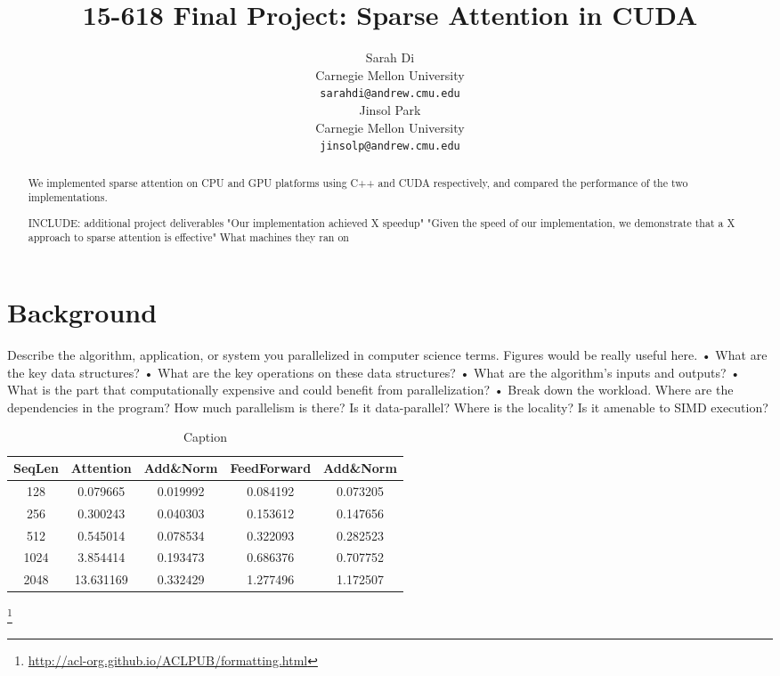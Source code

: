 \documentclass[11pt]{article}
\title{15-618 Final Project: Sparse Attention in CUDA}
\author{Sarah Di \\
  Carnegie Mellon University\\
  \texttt{sarahdi@andrew.cmu.edu} \\\And
  Jinsol Park \\
  Carnegie Mellon University\\
  \texttt{jinsolp@andrew.cmu.edu} \\}
\begin{document}
\maketitle
\begin{abstract}
We implemented sparse attention on CPU and GPU platforms using C++ and CUDA respectively, and compared the performance of the two implementations.

INCLUDE:
additional project deliverables 
"Our implementation achieved X speedup"
"Given the speed of our implementation, we demonstrate that a X approach to sparse attention is effective"
What machines they ran on

\end{abstract}

\section{Background}
\cite{beltagy2020longformer}

Describe the algorithm, application, or system you parallelized in computer science terms. Figures would be really useful here.
• What are the key data structures?
• What are the key operations on these data structures?
• What are the algorithm’s inputs and outputs?
• What is the part that computationally expensive and could benefit from parallelization?
• Break down the workload. Where are the dependencies in the program? How much parallelism is there? Is it data-parallel? Where is the locality? Is it amenable to SIMD execution?

\begin{table*}[h!]
\centering
 \begin{tabular}{||c | c c c c||} 
 \hline
 SeqLen & Attention & Add\&Norm & FeedForward & Add\&Norm \\ [0.5ex] 
 \hline\hline
 128 & 0.079665 & 0.019992 & 0.084192 & 0.073205 \\
 256 & 0.300243 & 0.040303 & 0.153612 & 0.147656 \\
 512 & 0.545014 & 0.078534 & 0.322093 & 0.282523 \\
 1024 & 3.854414 & 0.193473 & 0.686376 & 0.707752 \\
 2048 & 13.631169 & 0.332429 & 1.277496 & 1.172507 \\ [1ex] 
 \hline
 \end{tabular}
  \caption{Caption}
  \label{fig:enter-label}
\end{table*}


\footnote{\url{http://acl-org.github.io/ACLPUB/formatting.html}}
\end{document}
